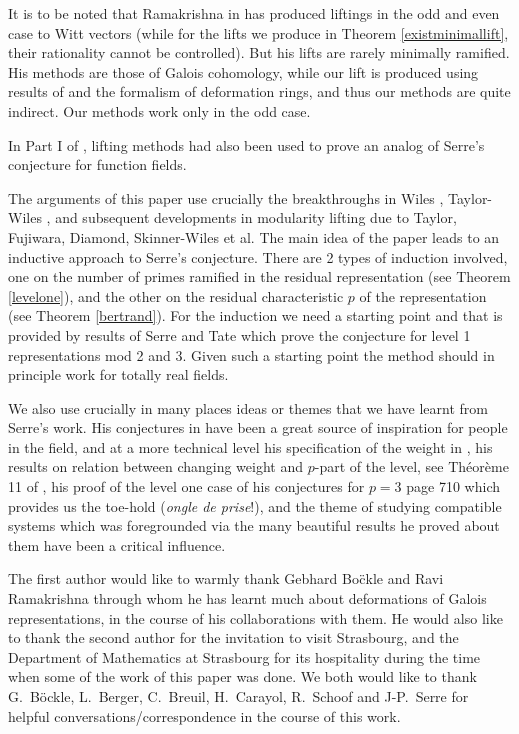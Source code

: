 \documentclass[12pt]{article}
\begin{document}
\vspace{.5cm}




It is to be noted that Ramakrishna in \cite{[R02]} has produced liftings in
the odd and even case to Witt vectors (while for the lifts we produce in
Theorem \ref{existminimallift}, their rationality cannot be
controlled). But his lifts are rarely minimally ramified.
His methods are those of Galois cohomology, while our lift is produced
using results of \cite{[T03]} and the formalism of deformation rings,
and thus our methods are quite indirect. Our methods work only in the
odd case.

In Part I of \cite{BoKh},  lifting  methods had also been used
to prove an analog
of Serre's conjecture for function fields.

The arguments of this paper use crucially the breakthroughs in
Wiles \cite{Wiles},
Taylor-Wiles \cite{TW}, and subsequent developments in modularity lifting
due to Taylor, Fujiwara, Diamond, Skinner-Wiles et al. The main idea of the paper leads to an
inductive approach to Serre's conjecture. There are 2 types of induction
involved, one on the number of primes ramified in the residual
representation
(see
Theorem \ref{levelone}), and the other on the residual characteristic
$p$ of the representation (see Theorem \ref{bertrand}). For the induction we
need a starting point and that is provided by results of Serre and Tate
which
prove the conjecture for level 1 representations mod 2 and 3. Given such a
starting point the method should in principle work for totally real fields.


We also use crucially in many places ideas or themes that
we have learnt from Serre's work.
His conjectures in \cite{Serre3} have been a great source of inspiration for
people in the field,
and at a more technical level his specification of the weight in
\cite{Serre3},
his  results
on relation between changing weight and $p$-part of the level, see
Th\'eor\`eme 11 of  \cite{Serre1},
his proof of the level one case of his conjectures for $p=3$
\cite{Serre2} page 710
which provides us
the toe-hold ({\it ongle de prise}!), and the theme
of studying compatible systems which was foregrounded via the many beautiful
results he proved about them have been a critical influence.

\vspace{3mm}

The first author would like to warmly thank Gebhard Bo\"ckle and Ravi
Ramakrishna through whom
he has learnt much about deformations of Galois representations, in the
course
of
his collaborations with them. He would also like to thank the
second author for the
invitation to visit Strasbourg, and the Department of Mathematics at
Strasbourg
for
its hospitality during the time when some of the work of this paper was
done.
We both would like to thank G.~B\"ockle, L.~Berger, C.~Breuil,
H.~Carayol,  R.~Schoof and J-P.~Serre for helpful
conversations/correspondence
in the course of this work.
\end{document}
